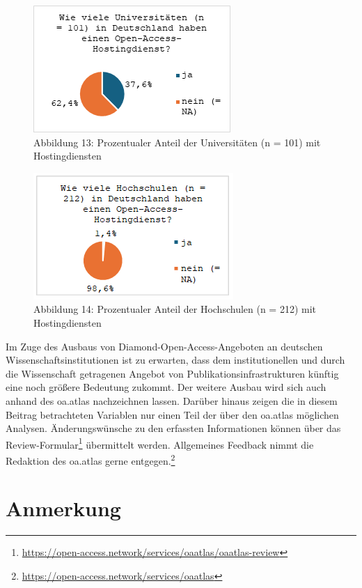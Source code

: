 \documentclass[a4paper,
fontsize=11pt,
oneside,
numbers=noperiodatend,
parskip=half-,
bibliography=totoc,
final
]{scrartcl}
\begin{document}
\begin{figure}[H]
\centering
\includegraphics[]{img/image014.png}
\caption{Abbildung 13: Prozentualer Anteil der Universitäten (n = 101) mit Hostingdiensten}
\end{figure}

\begin{figure}[H]
\centering
\includegraphics[]{img/image013.png}
\caption{Abbildung 14: Prozentualer Anteil der Hochschulen (n = 212) mit Hostingdiensten}
\end{figure}

Im Zuge des Ausbaus von Diamond-Open-Access-Angeboten an deutschen
Wissenschaftsinstitutionen ist zu erwarten, dass dem institutionellen
und durch die Wissenschaft getragenen Angebot von
Publikationsinfrastrukturen künftig eine noch größere Bedeutung zukommt.
Der weitere Ausbau wird sich auch anhand des oa.atlas nachzeichnen
lassen. Darüber hinaus zeigen die in diesem Beitrag betrachteten
Variablen nur einen Teil der über den oa.atlas möglichen Analysen.
Änderungswünsche zu den erfassten Informationen können über das
Review-Formular\footnote{\url{https://open-access.network/services/oaatlas/oaatlas-review}}
übermittelt werden. Allgemeines Feedback nimmt die Redaktion des
oa.atlas gerne entgegen.\footnote{\url{https://open-access.network/services/oaatlas}}

\section{Anmerkung}\label{anmerkung}
\end{document}
